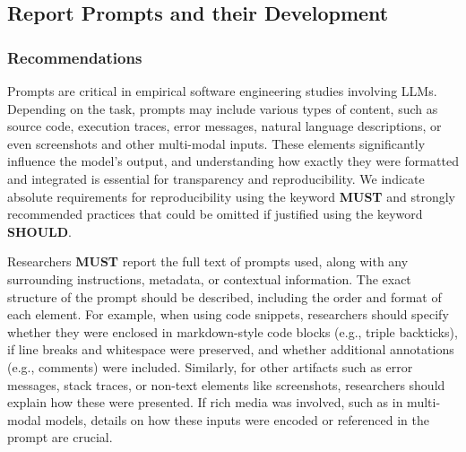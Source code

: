 



\subsection{Report Prompts and their Development}


\subsubsection{Recommendations}
Prompts are critical in empirical software engineering studies involving LLMs. Depending on the task, prompts may include various types of content, such as source code, execution traces, error messages, natural language descriptions, or even screenshots and other multi-modal inputs. These elements significantly influence the model’s output, and understanding how exactly they were formatted and integrated is essential for transparency and reproducibility. We indicate absolute requirements for reproducibility using the keyword \textbf{MUST} and strongly recommended practices that could be omitted if justified using the keyword \textbf{SHOULD}.

Researchers \textbf{MUST} report the full text of prompts used, along with any surrounding instructions, metadata, or contextual information. The exact structure of the prompt should be described, including the order and format of each element. For example, when using code snippets, researchers should specify whether they were enclosed in markdown-style code blocks (e.g., triple backticks), if line breaks and whitespace were preserved, and whether additional annotations (e.g., comments) were included. Similarly, for other artifacts such as error messages, stack traces, or non-text elements like screenshots, researchers should explain how these were presented. If rich media was involved, such as in multi-modal models, details on how these inputs were encoded or referenced in the prompt are crucial.

